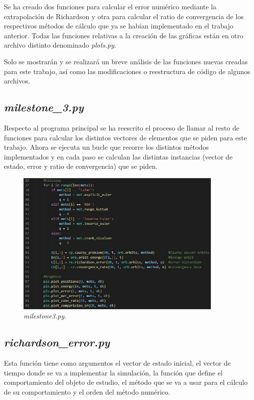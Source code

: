 \documentclass[12pt,a4paper]{article}
\begin{document}
Se ha creado dos funciones para calcular el error numérico mediante la extrapolación de Richardson y otra para calcular el ratio de convergencia de los respectivos métodos de cálculo que ya se habían implementado en el trabajo anterior. Todas las funciones relativas a la creación de las gráficas están en otro archivo distinto denominado \textit{plots.py}.

Solo se mostrarán y se realizará un breve análisis de las funciones nuevas creadas para este trabajo, así como las modificaciones o reestructura de código de algunos archivos. 

\subsection{\textit{milestone\_3.py}}
Respecto al programa principal se ha reescrito el proceso de llamar al resto de funciones para calcular los distintos vectores de elementos que se piden para este trabajo. Ahora se ejecuta un bucle que recorre los distintos métodos implementados y en cada paso se calculan las distintas instancias (vector de estado, error y ratio de convergencia) que se piden.
\begin{figure}[H] 
	\centering
	\includegraphics[width=0.9\textwidth]{FIGURES/Codigo/main_milestone3.jpg}
	\caption{\textit{milestone3.py}.}
\end{figure}

\subsection{\textit{richardson\_error.py}}
Esta función tiene como argumentos el vector de estado inicial, el vector de tiempo donde se va a implementar la simulación, la función que define el comportamiento del objeto de estudio, el método que se va a usar para el cálculo de su comportamiento y el orden del método numérico.
\end{document}
